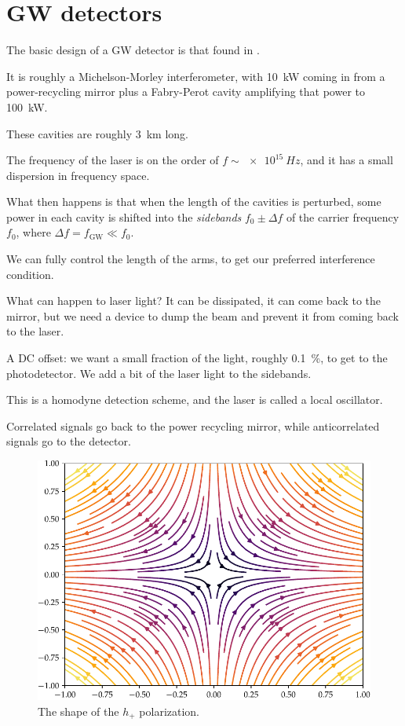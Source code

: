 \documentclass[main.tex]{subfiles}
\begin{document}
\section{GW detectors}


The basic design of a GW detector is that found in \textcite[fig.\ 3]{ligoscientificcollaborationandvirgocollaborationObservationGravitationalWaves2016}. 

It is roughly a Michelson-Morley interferometer, with \SI{10}{kW} coming in
from a power-recycling mirror 
plus a Fabry-Perot cavity amplifying that power to \SI{100}{kW}. 

These cavities are roughly \SI{3}{km} long. 

The frequency of the laser is on the order of \(f \sim \SI{e15}{Hz}\), 
and it has a small dispersion in frequency space. 

What then happens is that when the length of the cavities is perturbed,
some power in each cavity is shifted into the \emph{sidebands} 
\(f_0 \pm \Delta f\) of the carrier frequency \(f_0 \), 
where \(\Delta f = f _{\text{GW}} \ll f_0 \).

We can fully control the length of the arms, 
to get our preferred interference condition. 

What can happen to laser light? It can be dissipated, 
it can come back to the mirror, but we need a device
to dump the beam and prevent it from coming back to the laser. 

A DC offset: we want a small fraction of the light, roughly \SI{.1}{\percent}, 
to get to the photodetector. 
We add a bit of the laser light to the sidebands. 

This is a homodyne detection scheme, and the laser is called a local oscillator. 

Correlated signals go back to the power recycling mirror, while
anticorrelated signals go to the detector. 

\begin{figure}[ht]
\centering
\includegraphics[width=\textwidth]{figures/polarization}
\caption{The shape of the \(h_+\) polarization.}
\label{fig:polarization}
\end{figure}
\end{document}
